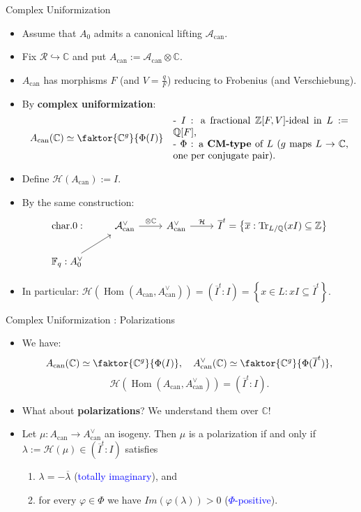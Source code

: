 \documentclass[usenames,dvipsnames,handout]{beamer}
\def\Q{\mathbb{Q}}
\def\Z{\mathbb{Z}}
\def\C{\mathbb{C}}
\def\F{\mathbb{F}}
\DeclareMathOperator{\Hom}{Hom}
\DeclareMathOperator{\Tr}{Tr}
\newcommand{\cH}{{\mathcal H}}
\newcommand{\vphi}{\varphi}
\newcommand{\set}[1]{\left\lbrace#1\right\rbrace }
\newcommand{\Acan}{\mathcal{A}_{\mathrm{can}}}
\newcommand{\AcanC}{A_{\mathrm{can}}}
\newcommand{\blue}[1]{\textcolor{blue}{#1}}
\begin{document}
\begin{frame}{ Complex Uniformization }
    \begin{itemize}
    \item Assume that $A_0$ admits a canonical lifting $\Acan$.
\pause   
    \item Fix $\mathcal{R} \hookrightarrow \C$ and put $\AcanC:=\Acan \otimes \C$.
\pause
    \item $\AcanC$ has morphisms $F$ (and $V=\frac{q}{F}$) reducing to Frobenius (and Verschiebung).
\pause
    \item By {\bf complex uniformization}:
    \[ \AcanC(\C) \simeq \faktor{\C^g}{\Phi(I)} \quad 
    \parbox{18em}{ - $I$ : a fractional $\Z[F,V]$-ideal in $L:=\Q[F]$,  \\
                  - $\Phi$ : a {\bf CM-type} of $L$ ($g$ maps $L\to \C$, one per conjugate pair). } \]
\pause
    \vspace{-1.3em}
    \item Define $\cH(\AcanC):=I$.
\pause
    \item By the same construction:
    \[
    \begin{tikzcd}[ampersand replacement=\&] %
    \text{char.}0 : \& \Acan^\vee \arrow[r, "\otimes \C"] \& \AcanC^\vee \arrow[r, "\mathcal{H}"] \& \overline{I}^t =\set{ \overline{x} : \Tr_{L/\Q}(xI)\subseteq \Z }\\
    \F_q : A_0^\vee \arrow[ur] \& \& \&
    \end{tikzcd}    
    \]
\pause
    \vspace{-1.5em}
    \item In particular: $\cH(\Hom(\AcanC,\AcanC^\vee)) = (\overline{I}^t:I) = \set{ x \in L : xI \subseteq \overline{I}^t }$.
	\end{itemize}
\end{frame}

\begin{frame}{ Complex Uniformization : Polarizations }
    \begin{itemize}
    \item We have: 
    \[ \AcanC(\C) \simeq \faktor{\C^g}{\Phi(I)}, \quad \AcanC^\vee(\C) \simeq \faktor{\C^g}{\Phi(\overline{I}^t)},\]
    \[ \cH(\Hom(\AcanC,\AcanC^\vee)) = (\overline{I}^t:I). \]
\pause         
    \item What about {\bf polarizations}? We understand them over $\C$!
\pause    
    \item Let $\mu:\AcanC\to \AcanC^\vee$ an isogeny. Then $\mu$ is a polarization if and only if
	       $\lambda := \cH(\mu) \in (\overline{I}^t:I)$ satisfies
	       \begin{enumerate}
\pause 
	       \item $\lambda = - \overline{\lambda}$ (\blue{totally imaginary}), and
\pause 
	       \item for every $\vphi\in \Phi$ we have $Im(\vphi(\lambda))>0$  (\blue{$\Phi$-positive}).
           \end{enumerate}
\pause            	  
	\end{itemize}
\end{frame}
\end{document}
